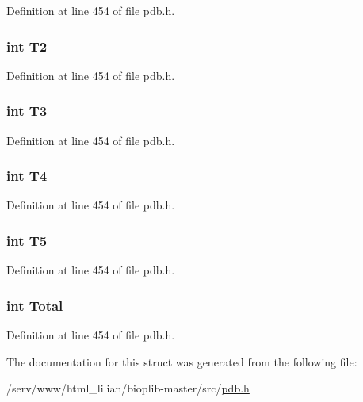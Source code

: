 Definition at line 454 of file pdb.\-h.

\hypertarget{struct_h_a_d_d_i_n_f_o_a185e71ed8316658125bb80cc43680c4b}{
\subsubsection[{T2}]{\setlength{\rightskip}{0pt plus 5cm}int T2}}\label{struct_h_a_d_d_i_n_f_o_a185e71ed8316658125bb80cc43680c4b}


Definition at line 454 of file pdb.\-h.

\hypertarget{struct_h_a_d_d_i_n_f_o_a426934668477e96d234068290983eb56}{
\subsubsection[{T3}]{\setlength{\rightskip}{0pt plus 5cm}int T3}}\label{struct_h_a_d_d_i_n_f_o_a426934668477e96d234068290983eb56}


Definition at line 454 of file pdb.\-h.

\hypertarget{struct_h_a_d_d_i_n_f_o_afad4354178f725a1c2a72331a18df13f}{
\subsubsection[{T4}]{\setlength{\rightskip}{0pt plus 5cm}int T4}}\label{struct_h_a_d_d_i_n_f_o_afad4354178f725a1c2a72331a18df13f}


Definition at line 454 of file pdb.\-h.

\hypertarget{struct_h_a_d_d_i_n_f_o_a125e7d5d31e775dbaa703281275a6091}{
\subsubsection[{T5}]{\setlength{\rightskip}{0pt plus 5cm}int T5}}\label{struct_h_a_d_d_i_n_f_o_a125e7d5d31e775dbaa703281275a6091}


Definition at line 454 of file pdb.\-h.

\hypertarget{struct_h_a_d_d_i_n_f_o_ae36a1ad4b467c9b1268db3125492db4c}{
\subsubsection[{Total}]{\setlength{\rightskip}{0pt plus 5cm}int Total}}\label{struct_h_a_d_d_i_n_f_o_ae36a1ad4b467c9b1268db3125492db4c}


Definition at line 454 of file pdb.\-h.



The documentation for this struct was generated from the following file\-:\begin{DoxyCompactItemize}
\item 
/serv/www/html\-\_\-lilian/bioplib-\/master/src/\hyperlink{pdb_8h}{pdb.\-h}\end{DoxyCompactItemize}
